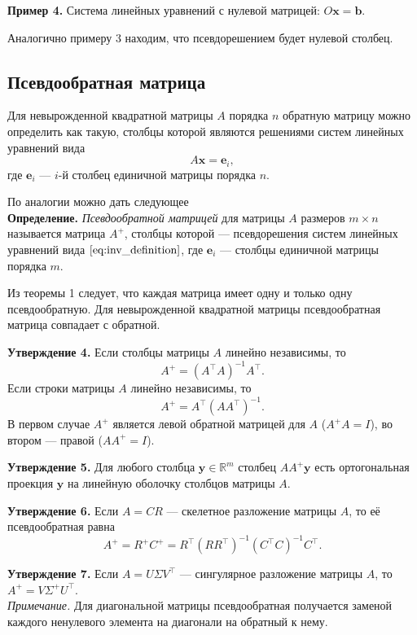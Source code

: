 \documentclass[11pt,a4paper]{article}
\begin{document}
    \textbf{Пример 4.} Система линейных уравнений с нулевой матрицей:
\(O \mathbf{x} = \mathbf{b}\).

Аналогично примеру 3 находим, что псевдорешением будет нулевой столбец.

    \hypertarget{ux43fux441ux435ux432ux434ux43eux43eux431ux440ux430ux442ux43dux430ux44f-ux43cux430ux442ux440ux438ux446ux430}{%
\subsection{Псевдообратная
матрица}\label{ux43fux441ux435ux432ux434ux43eux43eux431ux440ux430ux442ux43dux430ux44f-ux43cux430ux442ux440ux438ux446ux430}}

Для невырожденной квадратной матрицы \(A\) порядка \(n\) обратную
матрицу можно определить как такую, столбцы которой являются решениями
систем линейных уравнений вида \[
  A\mathbf{x} = \mathbf{e}_i, \tag{3} \label{eq:inv_definition}
\] где \(\mathbf{e}_i\) --- \(i\)-й столбец единичной матрицы порядка
\(n\).

По аналогии можно дать следующее\\
\textbf{Определение.} \emph{Псевдообратной матрицей} для матрицы \(A\)
размеров \(m \times n\) называется матрица \(A^+\), столбцы которой ---
псевдорешения систем линейных уравнений вида
\(\eqref{eq:inv_definition}\), где \(\mathbf{e}_i\) --- столбцы
единичной матрицы порядка \(m\).

Из теоремы 1 следует, что каждая матрица имеет одну и только одну
псевдообратную. Для невырожденной квадратной матрицы псевдообратная
матрица совпадает с обратной.

\textbf{Утверждение 4.} Если столбцы матрицы \(A\) линейно независимы,
то \[
  A^+ = (A^\top A)^{-1} A^\top.
\] Если строки матрицы \(A\) линейно независимы, то \[
  A^+ = A^\top (A A^\top)^{-1}.
\] В первом случае \(A^+\) является левой обратной матрицей для \(A\)
(\(A^+A=I\)), во втором --- правой (\(A A^+ = I\)).

\textbf{Утверждение 5.} Для любого столбца
\(\mathbf{y} \in \mathbb{R}^m\) столбец \(A A^+ \mathbf{y}\) есть
ортогональная проекция \(\mathbf{y}\) на линейную оболочку столбцов
матрицы \(A\).

\textbf{Утверждение 6.} Если \(A = CR\) --- скелетное разложение матрицы
\(A\), то её псевдообратная равна \[
  A^+ = R^+ C^+ = R^\top (R R^\top)^{-1} (C^\top C)^{-1} C^\top.
\]

\textbf{Утверждение 7.} Если \(A = U \Sigma V^\top\) --- сингулярное
разложение матрицы \(A\), то \(A^+ = V \Sigma^+ U^\top\).\\
\emph{Примечание.} Для диагональной матрицы псевдообратная получается
заменой каждого ненулевого элемента на диагонали на обратный к нему.
\end{document}
